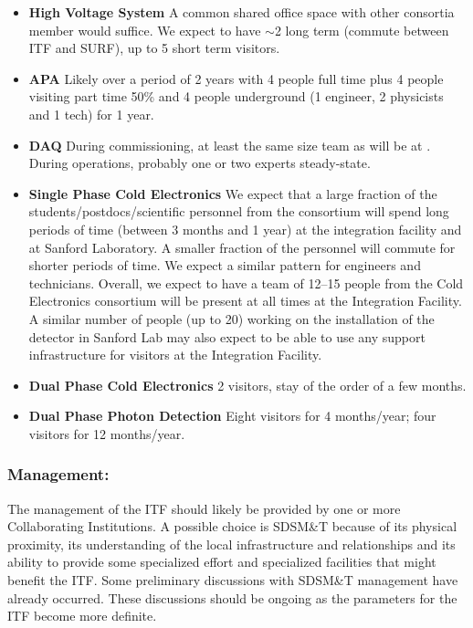 \begin{itemize}
  \item {\bf High Voltage System} A common shared office space with
    other consortia member would suffice. We expect to have $\sim$\num{2}
    long term (commute between ITF and SURF), up to \num{5} short term
    visitors.
  \item {\bf APA} Likely over a period of \num{2} years with \num{4} people full
    time plus \num{4} people visiting part time 50\% and \num{4} people
    underground (\num{1} engineer, \num{2} physicists and \num{1} tech) for \num{1}
    year.
  \item {\bf DAQ} During commissioning, at least the same size team as
    will be at .  During operations, probably one or two
    experts steady-state.
  \item {\bf Single Phase Cold Electronics} We expect that a large
    fraction of the students/postdocs/scientific personnel from the
    consortium will spend long periods of time (between \num{3} months and
    \num{1} year) at the integration facility and at Sanford Laboratory. A
    smaller fraction of the personnel will commute for shorter periods
    of time. We expect a similar pattern for engineers and
    technicians. Overall, we expect to have a team of 12--15 people
    from the Cold Electronics consortium will be present at all times
    at the Integration Facility. A similar number of people (up to
    \num{20}) working on the installation of the detector in Sanford Lab
    may also expect to be able to use any support infrastructure for
    visitors at the Integration Facility.
  \item {\bf Dual Phase Cold Electronics} \num{2} visitors, stay of the order of a few months.
  \item {\bf Dual Phase Photon Detection} Eight visitors for \num{4}
    months/year; four visitors for \num{12} months/year.
\end{itemize}


\subsubsection{Management:}
The management of the ITF should likely be provided by one or more
 Collaborating Institutions. A possible choice is SDSM\&T
because of its physical proximity, its understanding of the local
infrastructure and relationships and its ability to provide some
specialized effort and specialized facilities that might benefit the
ITF.  Some preliminary discussions with SDSM\&T management have
already occurred. These discussions should be ongoing as the
parameters for the ITF become more definite.


